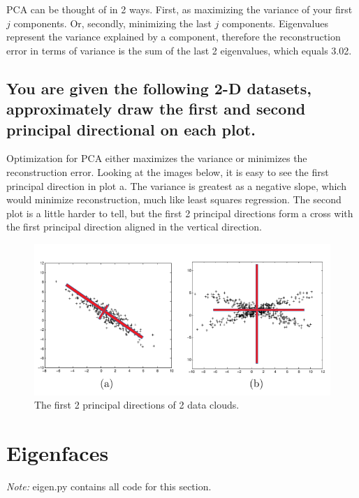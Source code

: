 \documentclass[a4paper]{article}
\begin{document}
PCA can be thought of in 2 ways.  First, as maximizing the variance of your first $j$ components.  Or, secondly, minimizing the last $j$ components.  Eigenvalues represent the variance explained by a component, therefore the reconstruction error in terms of variance is the sum of the last 2 eigenvalues, which equals 3.02.





\subsection{You are given the following 2-D datasets, approximately draw the first and second
principal directional on each plot.}


Optimization for PCA either maximizes the variance or minimizes the reconstruction error.  Looking at the images below, it is easy to see the first principal direction in plot a.  The variance is greatest as a negative slope, which would minimize reconstruction, much like least squares regression.  The second plot is a little harder to tell, but the first 2 principal directions form a cross with the first principal direction aligned in the vertical direction.

 

\begin{figure}[h]
    \centering
		\includegraphics[width=\textwidth]{pca_clouds.png}
        \caption{The first 2 principal directions of 2 data clouds.}
\end{figure}


\newpage
\section{Eigenfaces}

\textit{Note:} eigen.py contains all code for this section.
\end{document}
